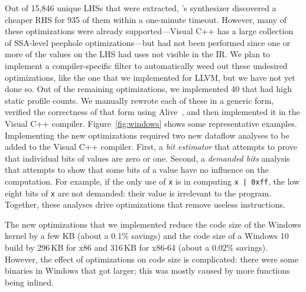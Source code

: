 Out of 15,846 unique LHSs that were extracted, \tool's synthesizer
discovered a cheaper RHS for 935 of them within a one-minute timeout.
%
However, many of these optimizations were already supported---Visual
C++ has a large collection of SSA-level peephole optimizations---but
had not been performed since one or more of the values on the LHS had
uses not visible in the \tool{} IR\@.
%
We plan to implement a compiler-specific filter to automatically weed
out these undesired optimizations, like the one that we implemented
for LLVM, but we have not yet done so.
%
Out of the remaining optimizations, we implemented 40 that had
high static profile counts.
%
We manually rewrote each of these in a generic form, verified the
correctness of that form using Alive~\cite{Lopes15}, and then
implemented it in the Visual C++ compiler.
%
Figure~\ref{fig:windows} shows some representative examples.
%
Implementing the new optimizations required two new dataflow analyses
to be added to the Visual C++ compiler.
%
First, a \emph{bit estimator} that attempts to prove that individual
bits of values are zero or one.
%
Second, a \emph{demanded bits} analysis that attempts to show that
some bits of a value have no influence on the computation.
%
For example, if the only use of \texttt{x} is in computing \texttt{x |
  0xff}, the low eight bits of \texttt{x} are not demanded: their
value is irrelevant to the program.
%
Together, these analyses drive optimizations that remove useless
instructions.


The new optimizations that we implemented reduce the code size of the
Windows kernel by a few KB (about a 0.1\% savings) and the code size
of a Windows 10 build by 296\,KB for x86 and 316\,KB for x86-64 (about
a 0.02\% savings).
%
However, the effect of optimizations on code size is complicated:
there were some binaries in Windows that got larger; this was mostly
caused by more functions being inlined.

